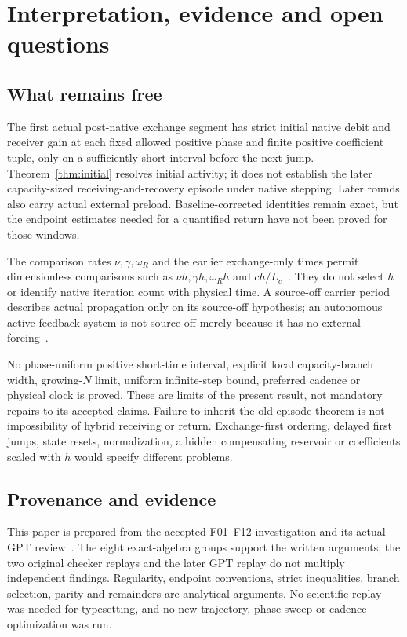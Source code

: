 \section{Interpretation, evidence and open questions}\label{sec:discussion}
\subsection{What remains free}\label{sec:open}
The first actual post-native exchange segment has strict initial native debit and receiver gain at each fixed allowed positive phase and finite positive coefficient tuple, only on a sufficiently short interval before the next jump. Theorem~\ref{thm:initial} resolves initial activity; it does not establish the later capacity-sized receiving-and-recovery episode under native stepping. Later rounds also carry actual external preload. Baseline-corrected identities remain exact, but the endpoint estimates needed for a quantified return have not been proved for those windows.

The comparison rates $\nu,\gamma,\omega_R$ and the earlier exchange-only times permit dimensionless comparisons such as $\nu h,\gamma h,\omega_Rh$ and $ch/L_c$~\cite[Section 3]{rr}. They do not select $h$ or identify native iteration count with physical time. A source-off carrier period describes actual propagation only on its source-off hypothesis; an autonomous active feedback system is not source-off merely because it has no external forcing~\cite[Section 6]{rx}.

No phase-uniform positive short-time interval, explicit local capacity-branch width, growing-$N$ limit, uniform infinite-step bound, preferred cadence or physical clock is proved. These are limits of the present result, not mandatory repairs to its accepted claims. Failure to inherit the old episode theorem is not impossibility of hybrid receiving or return. Exchange-first ordering, delayed first jumps, state resets, normalization, a hidden compensating reservoir or coefficients scaled with $h$ would specify different problems.

\subsection{Provenance and evidence}\label{sec:evidence}
This paper is prepared from the accepted F01--F12 investigation and its actual GPT review~\cite{investigation,acceptance}. The eight exact-algebra groups support the written arguments; the two original checker replays and the later GPT replay do not multiply independent findings. Regularity, endpoint conventions, strict inequalities, branch selection, parity and remainders are analytical arguments. No scientific replay was needed for typesetting, and no new trajectory, phase sweep or cadence optimization was run.


